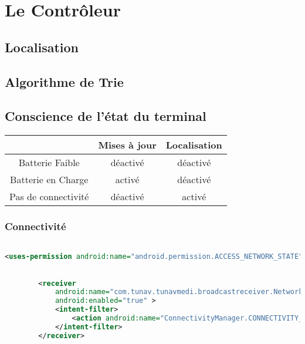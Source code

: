 \section{Le Contrôleur}

\subsection{Localisation}

\subsection{Algorithme de Trie}

\subsection{Conscience de l'état du terminal}

\begin{table}[H]
\centering
\begin{tabular}{|c|c|c|}
\hline
&\textsf{Mises à jour} & \textsf{Localisation}\\
\hline
\textsf{Batterie Faible} & déactivé & déactivé\\
\hline
\textsf{Batterie en Charge} & activé & déactivé\\
\hline
\textsf{Pas de connectivité} & déactivé & activé\\
\hline
\end{tabular}
\end{table}

\subsubsection{Connectivité}

\begin{lstlisting}[language=xml, caption=Permission d’accès à l’état des interfaces réseaux.]

<uses-permission android:name="android.permission.ACCESS_NETWORK_STATE" />

\end{lstlisting}

\begin{lstlisting}[language=xml, caption=Enregistrement du  NetworkReceiver aux événements liée au status des interfaces réseaux.]

        <receiver
            android:name="com.tunav.tunavmedi.broadcastreceiver.NetworkReceiver"
            android:enabled="true" >
            <intent-filter>
                <action android:name="ConnectivityManager.CONNECTIVITY_ACTION" />
            </intent-filter>
        </receiver>

\end{lstlisting}

